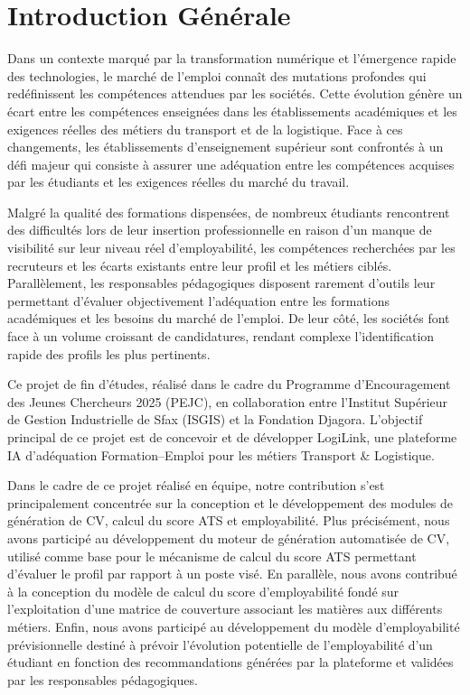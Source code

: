 ﻿%

\chapter*{Introduction Générale}
\label{chap:introduction}

Dans un contexte marqué par la transformation numérique et l'émergence rapide des technologies, le marché de l'emploi connaît des mutations profondes qui redéfinissent les compétences attendues par les sociétés. Cette évolution génère un écart entre les compétences enseignées dans les établissements académiques et les exigences réelles des métiers du transport et de la logistique. Face à ces changements, les établissements d'enseignement supérieur sont confrontés à un défi majeur qui consiste à assurer une adéquation entre les compétences acquises par les étudiants et les exigences réelles du marché du travail. 

\noindent Malgré la qualité des formations dispensées, de nombreux étudiants rencontrent des difficultés lors de leur insertion professionnelle en raison d'un manque de visibilité sur leur niveau réel d'employabilité, les compétences recherchées par les recruteurs et les écarts existants entre leur profil et les métiers ciblés. Parallèlement, les responsables pédagogiques disposent rarement d'outils leur permettant d'évaluer objectivement l'adéquation entre les formations académiques et les besoins du marché de l'emploi. De leur côté, les sociétés font face à un volume croissant de candidatures, rendant complexe l'identification rapide des profils les plus pertinents. 

\noindent Ce projet de fin d’études, réalisé dans le cadre du Programme d'Encouragement des Jeunes Chercheurs 2025 (PEJC), en collaboration entre l'Institut Supérieur de Gestion Industrielle de Sfax (ISGIS) et la Fondation Djagora. L'objectif principal de ce projet est de concevoir et de développer LogiLink, une plateforme IA d'adéquation Formation–Emploi pour les métiers Transport \& Logistique.

\noindent Dans le cadre de ce projet réalisé en équipe, notre contribution s'est principalement concentrée sur la conception et le développement des modules de génération de CV, calcul du score ATS et employabilité. Plus précisément, nous avons participé au développement du moteur de génération automatisée de CV, utilisé comme base pour le mécanisme de calcul du score ATS permettant d'évaluer le profil par rapport à un poste visé. En parallèle, nous avons contribué à la conception du modèle de calcul du score d'employabilité fondé sur l'exploitation d'une matrice de couverture associant les matières aux différents métiers. Enfin, nous avons participé au développement du modèle d'employabilité prévisionnelle destiné à prévoir l'évolution potentielle de l'employabilité d'un étudiant en fonction des  recommandations générées par la plateforme et validées par les responsables pédagogiques.

